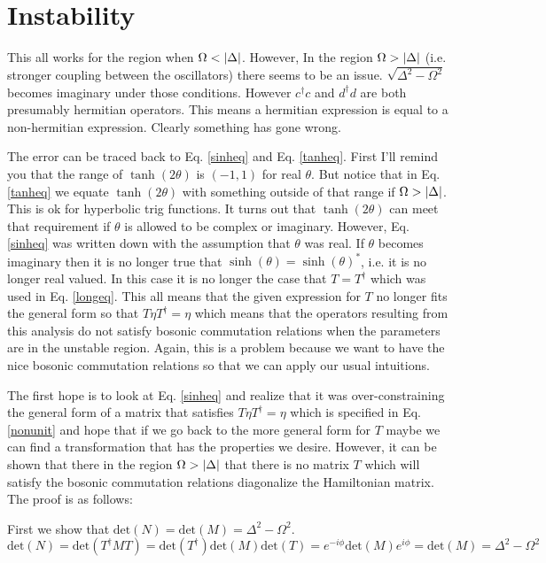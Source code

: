 \documentclass[12pt]{article}
\begin{document}
\section{Instability}

This all works for the region when $\Omega < \abs{\Delta}$. However, In the region $\Omega>\abs{\Delta}$ (i.e. stronger coupling between the oscillators) there seems to be an issue. $\sqrt{\Delta^2-\Omega^2}$ becomes imaginary under those conditions. However $c^{\dag}c$ and $d^{\dag}d$ are both presumably hermitian operators. This means a hermitian expression is equal to a non-hermitian expression. Clearly something has gone wrong.

The error can be traced back to Eq. \ref{sinheq} and Eq. \ref{tanheq}. First I'll remind you that the range of $\tanh(2\theta)$ is $(-1,1)$ for real $\theta$. But notice that in Eq. \ref{tanheq} we equate $\tanh(2\theta)$ with something outside of that range if $\Omega>\abs{\Delta}$. This is ok for hyperbolic trig functions. It turns out that $\tanh(2\theta)$ can meet that requirement if $\theta$ is allowed to be complex or imaginary. However, Eq. \ref{sinheq} was written down with the assumption that $\theta$ was real. If $\theta$ becomes imaginary then it is no longer true that $\sinh(\theta) = \sinh(\theta)^*$, i.e. it is no longer real valued. In this case it is no longer the case that $T=T^{\dag}$ which was used in Eq. \ref{longeq}.  This all means that the given expression for $T$ no longer fits the general form so that $T \eta T^{\dag}= \eta$ which means that the operators resulting from this analysis do not satisfy bosonic commutation relations when the parameters are in the unstable region. Again, this is a problem because we want to have the nice bosonic commutation relations so that we can apply our usual intuitions.

The first hope is to look at Eq. \ref{sinheq} and realize that it was over-constraining the general form of a matrix that satisfies $T \eta T^{\dag} = \eta$ which is specified in Eq. \ref{nonunit} and hope that if we go back to the more general form for $T$ maybe we can find a transformation that has the properties we desire. However, it can be shown that there in the region $\Omega > \abs{\Delta}$ that there is no matrix $T$ which will satisfy the bosonic commutation relations  diagonalize the Hamiltonian matrix. The proof is as follows:

First we show that $\text{det}(N) = \text{det}(M) = \Delta^2-\Omega^2$.
\begin{equation}
\text{det}(N) = \text{det}(T^{\dag}MT) = \text{det}(T^{\dag})\text{det}(M)\text{det}(T) = e^{-i\phi} \text{det}(M) e^{i\phi} = \text{det}(M) =  \Delta^2-\Omega^2
\end{equation}
\end{document}
